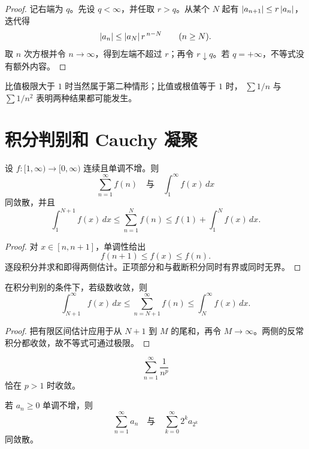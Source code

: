 \begin{proof}
记右端为 \(q\)。先设 \(q<\infty\)，并任取 \(r>q\)。从某个 \(N\)
起有 \(\left|a_{n+1}\right|\le r\left|a_n\right|\)，迭代得
\[
 \left|a_n\right|\le \left|a_N\right|r^{\,n-N}\qquad(n\ge N).
\]
取 \(n\) 次方根并令 \(n\to\infty\)，得到左端不超过 \(r\)；再令
\(r\downarrow q\)。若 \(q=+\infty\)，不等式没有额外内容。
\end{proof}

比值极限大于 \(1\) 时当然属于第二种情形；比值或根值等于 \(1\) 时，
\(\sum1/n\) 与 \(\sum1/n^2\) 表明两种结果都可能发生。

\section{积分判别和 Cauchy 凝聚}

\begin{theorem}[积分判别]
\label{thm:integral-test-series}
设 \(f:[1,\infty)\to[0,\infty)\) 连续且单调不增。则
\[
 \sum_{n=1}^\infty f(n)
\quad\text{与}\quad
 \int_1^\infty f(x)\,dx
\]
同敛散，并且
\[
 \int_1^{N+1}f(x)\,dx
 \le\sum_{n=1}^N f(n)
 \le f(1)+\int_1^N f(x)\,dx.
\]
\end{theorem}

\begin{proof}
对 \(x\in[n,n+1]\)，单调性给出
\[
 f(n+1)\le f(x)\le f(n).
\]
逐段积分并求和即得两侧估计。正项部分和与截断积分同时有界或同时无界。
\end{proof}

\begin{corollary}[积分判别的余项估计]
\label{cor:integral-test-remainder}
在积分判别的条件下，若级数收敛，则
\[
 \int_{N+1}^{\infty}f(x)\,dx
 \le \sum_{n=N+1}^{\infty}f(n)
 \le \int_N^{\infty}f(x)\,dx.
\]
\end{corollary}

\begin{proof}
把有限区间估计应用于从 \(N+1\) 到 \(M\) 的尾和，再令
\(M\to\infty\)。两侧的反常积分都收敛，故不等式可通过极限。
\end{proof}

\begin{corollary}
\[
 \sum_{n=1}^\infty\frac1{n^p}
\]
恰在 \(p>1\) 时收敛。
\end{corollary}

\begin{theorem}
\label{thm:cauchy-condensation}
若 \(a_n\ge0\) 单调不增，则
\[
 \sum_{n=1}^\infty a_n
\quad\text{与}\quad
 \sum_{k=0}^\infty 2^k a_{2^k}
\]
同敛散。
\end{theorem}

